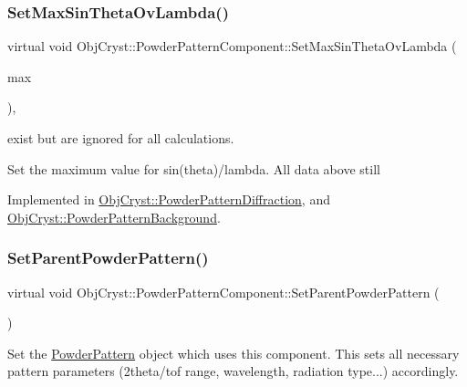 \subsubsection{\texorpdfstring{SetMaxSinThetaOvLambda()}{SetMaxSinThetaOvLambda()}}
{\footnotesize\ttfamily virtual void Obj\+Cryst\+::\+Powder\+Pattern\+Component\+::\+Set\+Max\+Sin\+Theta\+Ov\+Lambda (\begin{DoxyParamCaption}\item[{const R\+E\+AL}]{max }\end{DoxyParamCaption})\hspace{0.3cm}{\ttfamily [protected]}, {}}



exist but are ignored for all calculations. 

Set the maximum value for sin(theta)/lambda. All data above still 

Implemented in \mbox{\hyperlink{class_obj_cryst_1_1_powder_pattern_diffraction_a6eabf890d810833b58a903f70dad5885}{Obj\+Cryst\+::\+Powder\+Pattern\+Diffraction}}, and \mbox{\hyperlink{class_obj_cryst_1_1_powder_pattern_background_a3d1c345df8269ff883bd3b6f82b57d57}{Obj\+Cryst\+::\+Powder\+Pattern\+Background}}.

\mbox{\label{class_obj_cryst_1_1_powder_pattern_component_a6b3dc911118c280dbbdcb7fb97acf980}} 
\subsubsection{\texorpdfstring{SetParentPowderPattern()}{SetParentPowderPattern()}}
{\footnotesize\ttfamily virtual void Obj\+Cryst\+::\+Powder\+Pattern\+Component\+::\+Set\+Parent\+Powder\+Pattern (\begin{DoxyParamCaption}\item[{\mbox{\hyperlink{class_obj_cryst_1_1_powder_pattern}{Powder\+Pattern}} \&}]{ }\end{DoxyParamCaption})\hspace{0.3cm}{\ttfamily [pure virtual]}}

Set the \mbox{\hyperlink{class_obj_cryst_1_1_powder_pattern}{Powder\+Pattern}} object which uses this component. This sets all necessary pattern parameters (2theta/tof range, wavelength, radiation type...) accordingly. 

